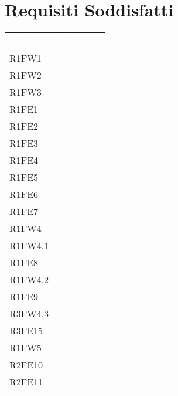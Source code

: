 \section{Requisiti Soddisfatti}

\begin{table}[!htbp]
\renewcommand{\arraystretch}{1.5}
\begin{tabular}[t]{ m{}<{\centering}  m{}<{\centering} }
	\rowcolor{darkblue}
	\textcolor{white}{\textbf{Fonte}} &\textcolor{white}{\textbf{Requisiti}}\\ 

	R1FW1 & \So \\	
	 
	R1FW2 & \So \\	

	R1FW3 & \So \\	
	 
	R1FE1 & \So \\	
	 
	R1FE2 & \So \\	
	 
	R1FE3 & \So \\	

	R1FE4 & \So \\	
	
	R1FE5 & \So \\
	 
	R1FE6 & \So \\	 
	 
	R1FE7 & \So \\	

	R1FW4 & \So \\ 
	 
	R1FW4.1& \Ns \\	
	 
	R1FE8 & \Ns \\	
	 
	R1FW4.2 & \Ns \\		 

	R1FE9 & \Ns \\		
	 
	R3FW4.3 & \So \\				
	 
	R3FE15 & \So \\			
	  	 	 	
	R1FW5 & \So \\		
	
	R2FE10 & \Ns \\
	
	R2FE11 & \Ns \\
	 

\end{tabular}
\end{table}
